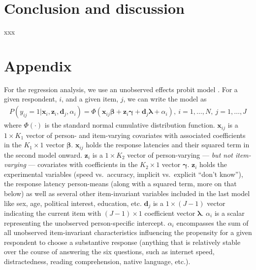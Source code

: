 \documentclass[Royal,times,sageh]{sagej}
\begin{document}
\hypertarget{conclusion-and-discussion}{%
\section{Conclusion and discussion}\label{conclusion-and-discussion}}

xxx

\hypertarget{appendix}{%
\section{Appendix}\label{appendix}}

For the regression analysis, we use an unobserved effects probit model
\citep{Wooldridge2002}. For a given respondent, \(i\), and a given item,
\(j\), we can write the model as \begin{align}
P(y_{ij} = 1 | \bm{x}_{i}, \bm{z}_{i}, \bm{d}_{j}, \alpha_{i}) = \Phi(\bm{x}_{ij}\bm{\beta} + \bm{z}_{i}\bm{\gamma} + \bm{d}_{j}\bm{\lambda} + \alpha_{i}), \ i = 1, \ldots, N, \ j = 1, \ldots, J \label{eq:probit}
\end{align} where \(\Phi(\cdot)\) is the standard normal cumulative
distribution function. \(\bm{x}_{ij}\) is a \(1 \times K_{1}\) vector of
person- and item-varying covariates with associated coefficients in the
\(K_{1} \times 1\) vector \(\bm{\beta}\). \(\bm{x}_{ij}\) holds the
response latencies and their squared term in the second model onward.
\(\bm{z}_{i}\) is a \(1 \times K_{2}\) vector of person-varying ---
\emph{but not item-varying} --- covariates with coefficients in the
\(K_{2} \times 1\) vector \(\bm{\gamma}\). \(\bm{z}_{i}\) holds the
experimental variables (speed vs.~accuracy, implicit vs.~explicit
``don't know''), the response latency person-means (along with a squared
term, more on that below) as well as several other item-invariant
variables included in the last model like sex, age, political interest,
education, etc. \(\bm{d}_{j}\) is a \(1 \times (J - 1)\) vector
indicating the current item with \((J - 1) \times 1\) coefficient vector
\(\bm{\lambda}\). \(\alpha_{i}\) is a scalar representing the unobserved
person-specific intercept. \(\alpha_{i}\) encompasses the sum of all
unobserved item-invariant characteristics influencing the propensity for
a given respondent to choose a substantive response (anything that is
relatively stable over the course of answering the six questions, such
as internet speed, distractedness, reading comprehension, native
language, etc.).
\end{document}

